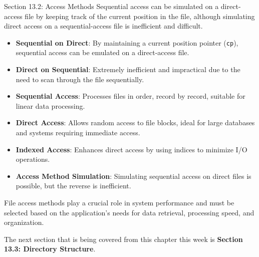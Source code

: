 \begin{notes}{Section 13.2: Access Methods}
    Sequential access can be simulated on a direct-access file by keeping track of the current position in the file, although simulating direct access on a sequential-access file is inefficient and difficult.
    
    \begin{highlight}
    
        \begin{itemize}
            \item \textbf{Sequential on Direct}: By maintaining a current position pointer (\texttt{cp}), sequential access can be emulated on a direct-access file.
            \item \textbf{Direct on Sequential}: Extremely inefficient and impractical due to the need to scan through the file sequentially.
        \end{itemize}
    
    \end{highlight}
    
    \begin{highlight}
    
        \begin{itemize}
            \item \textbf{Sequential Access}: Processes files in order, record by record, suitable for linear data processing.
            \item \textbf{Direct Access}: Allows random access to file blocks, ideal for large databases and systems requiring immediate access.
            \item \textbf{Indexed Access}: Enhances direct access by using indices to minimize I/O operations.
            \item \textbf{Access Method Simulation}: Simulating sequential access on direct files is possible, but the reverse is inefficient.
        \end{itemize}
    
    File access methods play a crucial role in system performance and must be selected based on the application's needs for data retrieval, processing speed, and organization.
    
    \end{highlight}
\end{notes}

The next section that is being covered from this chapter this week is \textbf{Section 13.3: Directory Structure}.

